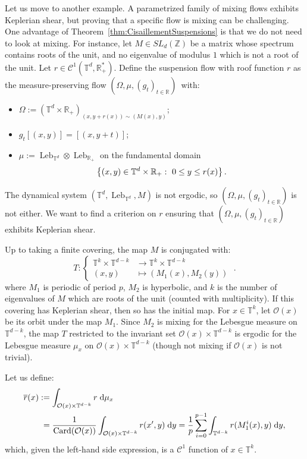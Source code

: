\documentclass[10pt]{amsart}
\theoremstyle{definition}\newtheorem{defi}[theo]{Definition}\newtheorem{rema}[theo]{Remark}\newtheorem{exam}[theo]{Example}\newtheorem{exem}[theo]{Example}\newtheorem{nota}[theo]{Notation}
\DeclareMathOperator{\Card}{Card}
\DeclareMathOperator{\Leb}{Leb}
\newcommand{\Z}{\mathbb{Z}}
\newcommand{\R}{\mathbb{R}}
\newcommand{\Tbb}{\mathbb{T}}
\newcommand{\Ccal}{\mathcal{C}}
\newcommand{\Ocal}{\mathcal{O}}
\newcommand{\dd}{\;{\rm d}}
\begin{document}
Let us move to another example. A parametrized family of mixing flows exhibits Keplerian shear, but proving that a specific flow is mixing can be challenging. One advantage of Theorem~\ref{thm:CisaillementSuspensions} is that we do not need to look at mixing. For instance, let $M \in SL_d (\Z)$ be a matrix whose spectrum contains roots of the unit, and no eigenvalue of modulus $1$ which is not a root of the unit. Let $r \in \Ccal^1 (\Tbb^d, \R_+^*)$. Define the suspension flow with roof function $r$ as the measure-preserving flow $(\Omega, \mu, (g_t)_{t \in \R})$~with:
\begin{itemize}
\item $\Omega := (\Tbb^d \times \R_+)_{(x,y+r(x)) \sim (M(x),y)}$;
\item $g_t [(x,y)] = [(x,y+t)]$;
\item $\mu := \Leb_{\Tbb^d} \otimes \Leb_{\R_+}$ on the fundamental domain 
\[
\left\{(x,y) \in \Tbb^d \times \R_+ :\linebreak\ 0 \leq y \leq r(x) \right\}.
\]
\end{itemize}
The dynamical system $(\Tbb^d, \Leb_{\Tbb^d}, M)$ is not ergodic, so $(\Omega, \mu, (g_t)_{t \in \R})$ is not either. We want to find a criterion on $r$ ensuring that $(\Omega, \mu, (g_t)_{t \in \R})$ exhibits Keplerian shear.


Up to taking a finite covering, the map $M$ is conjugated with:
\[
T :
\begin{cases}
\Tbb^k \times \Tbb^{d-k} & \to \Tbb^k \times \Tbb^{d-k} \\
(x,y) & \mapsto (M_1 (x), M_2 (y))
\end{cases}\;.
\]
where $M_1$ is periodic of period $p$, $M_2$ is hyperbolic, and $k$ is the number of eigenvalues of $M$ which are roots of the unit (counted with multiplicity). If this covering has Keplerian shear, then so has the initial map. For $x \in \Tbb^k$, let $\Ocal (x)$ be its orbit under the map $M_1$. Since $M_2$ is mixing for the Lebesgue measure on $\Tbb^{d-k}$, the map $T$ restricted to the invariant set $\Ocal (x) \times \Tbb^{d-k}$ is ergodic for the Lebesgue measure $\mu_x$ on $\Ocal (x) \times \Tbb^{d-k}$ (though not mixing if $\Ocal (x)$ is not trivial).


Let us define:
\begin{align*}
\overline{r} (x) & := \int_{\Ocal (x) \times \Tbb^{d-k}} r \dd \mu_x \\
& \;= \frac{1}{\Card (\Ocal (x))} \int_{\Ocal (x) \times \Tbb^{d-k}} r (x',y) \dd y = \frac{1}{p} \sum_{i=0}^{p-1} \int_{\Tbb^{d-k}} r (M_1^i (x),y) \dd y,
\end{align*}
which, given the left-hand side expression, is a $\Ccal^1$ function of $x \in \Tbb^k$.
\end{document}
